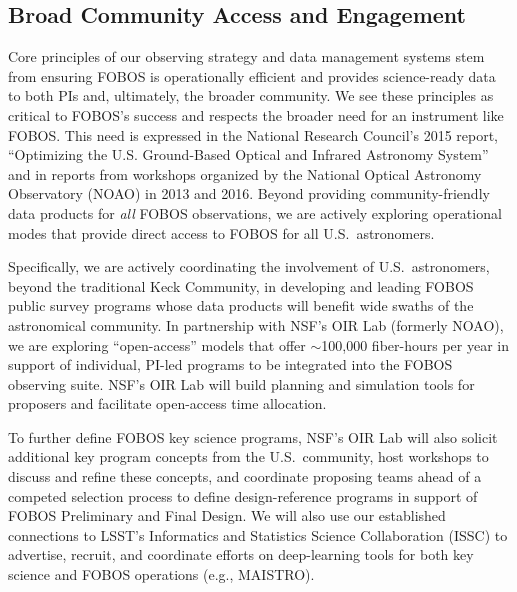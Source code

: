 \documentclass[oneside,11pt]{amsart}
\begin{document}
\subsection{Broad Community Access and Engagement}

Core principles of our observing strategy and data management systems
stem from ensuring FOBOS is operationally efficient and provides
science-ready data to both PIs and, ultimately, the broader
community. We see these principles as critical to FOBOS's success and
respects the broader need for an instrument like FOBOS. This need is
expressed in the National Research Council's 2015 report,
``Optimizing the U.S. Ground-Based Optical and Infrared Astronomy
System'' \citep{NAP21722} and in reports from workshops organized by
the National Optical Astronomy Observatory (NOAO) in 2013 and 2016.
Beyond providing community-friendly data products for {\it all} FOBOS
observations, we are actively exploring operational modes that
provide direct access to FOBOS for all U.S.\ astronomers.

Specifically, we are actively coordinating the involvement of U.S.\
astronomers, beyond the traditional Keck Community, in developing and
leading FOBOS public survey programs whose data products will benefit
wide swaths of the astronomical community. In partnership with NSF's
OIR Lab (formerly NOAO), we are exploring ``open-access'' models that
offer $\sim$100,000 fiber-hours per year in support of individual,
PI-led programs to be integrated into the FOBOS observing suite.
NSF's OIR Lab will build planning and simulation tools for proposers
and facilitate open-access time allocation.

To further define FOBOS key science programs, NSF's OIR Lab will also
solicit additional key program concepts from the U.S.\ community,
host workshops to discuss and refine these concepts, and coordinate
proposing teams ahead of a competed selection process to define
design-reference programs in support of FOBOS Preliminary and Final
Design. We will also use our established connections to LSST's
Informatics and Statistics Science Collaboration (ISSC) to advertise,
recruit, and coordinate efforts on deep-learning tools for both key
science and FOBOS operations (e.g., MAISTRO).
\end{document}
